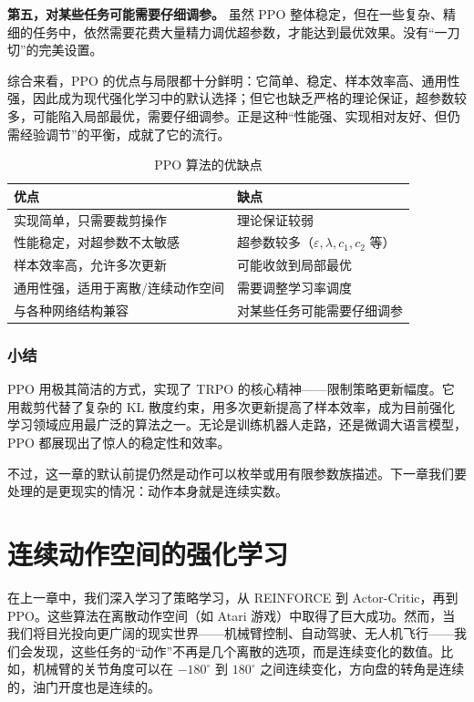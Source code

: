 \documentclass[lang=cn,zihao=-4,a4paper,fontset=windows]{beautybook}
\begin{document}
\textbf{第五，对某些任务可能需要仔细调参。} 虽然 PPO 整体稳定，但在一些复杂、精细的任务中，依然需要花费大量精力调优超参数，才能达到最优效果。没有“一刀切”的完美设置。

综合来看，PPO 的优点与局限都十分鲜明：它简单、稳定、样本效率高、通用性强，因此成为现代强化学习中的默认选择；但它也缺乏严格的理论保证，超参数较多，可能陷入局部最优，需要仔细调参。正是这种“性能强、实现相对友好、但仍需经验调节”的平衡，成就了它的流行。

\begin{table}[H]
\centering
\caption{PPO 算法的优缺点}
\begin{tabular}{p{}p{}}
\toprule
\textbf{优点} & \textbf{缺点} \\
\midrule
实现简单，只需要裁剪操作 & 理论保证较弱 \\
性能稳定，对超参数不太敏感 & 超参数较多（$\varepsilon, \lambda, c_1, c_2$ 等） \\
样本效率高，允许多次更新 & 可能收敛到局部最优 \\
通用性强，适用于离散/连续动作空间 & 需要调整学习率调度 \\
与各种网络结构兼容 & 对某些任务可能需要仔细调参 \\
\bottomrule
\end{tabular}
\end{table}

\subsection{小结}

PPO 用极其简洁的方式，实现了 TRPO 的核心精神——限制策略更新幅度。它用裁剪代替了复杂的 KL 散度约束，用多次更新提高了样本效率，成为目前强化学习领域应用最广泛的算法之一。无论是训练机器人走路，还是微调大语言模型，PPO 都展现出了惊人的稳定性和效率。

\noindent 不过，这一章的默认前提仍然是动作可以枚举或用有限参数族描述。下一章我们要处理的是更现实的情况：动作本身就是连续实数。

\chapter{连续动作空间的强化学习}

在上一章中，我们深入学习了策略学习，从 REINFORCE 到 Actor-Critic，再到 PPO。这些算法在离散动作空间（如 Atari 游戏）中取得了巨大成功。然而，当我们将目光投向更广阔的现实世界——机械臂控制、自动驾驶、无人机飞行——我们会发现，这些任务的“动作”不再是几个离散的选项，而是连续变化的数值。比如，机械臂的关节角度可以在 $-180^\circ$ 到 $180^\circ$ 之间连续变化，方向盘的转角是连续的，油门开度也是连续的。
\end{document}

